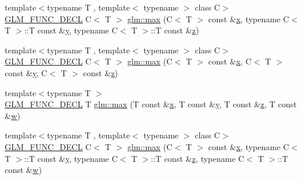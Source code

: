\begin{DoxyCompactItemize}
\item 
{\footnotesize template$<$typename T , template$<$ typename $>$ class C$>$ }\\\mbox{\hyperlink{setup_8hpp_ab2d052de21a70539923e9bcbf6e83a51}{G\+L\+M\+\_\+\+F\+U\+N\+C\+\_\+\+D\+E\+CL}} C$<$ T $>$ \mbox{\hyperlink{group__gtx__extended__min__max_gae1b7bbe5c91de4924835ea3e14530744}{glm\+::max}} (C$<$ T $>$ const \&\mbox{\hyperlink{_s_d_l__opengl_8h_ad0e63d0edcdbd3d79554076bf309fd47}{x}}, typename C$<$ T $>$\+::T const \&\mbox{\hyperlink{_s_d_l__opengl_8h_a1675d9d7bb68e1657ff028643b4037e3}{y}}, typename C$<$ T $>$\+::T const \&\mbox{\hyperlink{_s_d_l__opengl__glext_8h_a5e74030ebb3297ce1b37ff716fedd68f}{z}})
\item 
{\footnotesize template$<$typename T , template$<$ typename $>$ class C$>$ }\\\mbox{\hyperlink{setup_8hpp_ab2d052de21a70539923e9bcbf6e83a51}{G\+L\+M\+\_\+\+F\+U\+N\+C\+\_\+\+D\+E\+CL}} C$<$ T $>$ \mbox{\hyperlink{group__gtx__extended__min__max_gaf832e9d4ab4826b2dda2fda25935a3a4}{glm\+::max}} (C$<$ T $>$ const \&\mbox{\hyperlink{_s_d_l__opengl_8h_ad0e63d0edcdbd3d79554076bf309fd47}{x}}, C$<$ T $>$ const \&\mbox{\hyperlink{_s_d_l__opengl_8h_a1675d9d7bb68e1657ff028643b4037e3}{y}}, C$<$ T $>$ const \&\mbox{\hyperlink{_s_d_l__opengl__glext_8h_a5e74030ebb3297ce1b37ff716fedd68f}{z}})
\item 
{\footnotesize template$<$typename T $>$ }\\\mbox{\hyperlink{setup_8hpp_ab2d052de21a70539923e9bcbf6e83a51}{G\+L\+M\+\_\+\+F\+U\+N\+C\+\_\+\+D\+E\+CL}} T \mbox{\hyperlink{group__gtx__extended__min__max_ga78e04a0cef1c4863fcae1a2130500d87}{glm\+::max}} (T const \&\mbox{\hyperlink{_s_d_l__opengl_8h_ad0e63d0edcdbd3d79554076bf309fd47}{x}}, T const \&\mbox{\hyperlink{_s_d_l__opengl_8h_a1675d9d7bb68e1657ff028643b4037e3}{y}}, T const \&\mbox{\hyperlink{_s_d_l__opengl__glext_8h_a5e74030ebb3297ce1b37ff716fedd68f}{z}}, T const \&\mbox{\hyperlink{_s_d_l__opengl__glext_8h_a6ee8f168a7ab6785a9bb57c6715dad99}{w}})
\item 
{\footnotesize template$<$typename T , template$<$ typename $>$ class C$>$ }\\\mbox{\hyperlink{setup_8hpp_ab2d052de21a70539923e9bcbf6e83a51}{G\+L\+M\+\_\+\+F\+U\+N\+C\+\_\+\+D\+E\+CL}} C$<$ T $>$ \mbox{\hyperlink{group__gtx__extended__min__max_ga7cca8b53cfda402040494cdf40fbdf4a}{glm\+::max}} (C$<$ T $>$ const \&\mbox{\hyperlink{_s_d_l__opengl_8h_ad0e63d0edcdbd3d79554076bf309fd47}{x}}, typename C$<$ T $>$\+::T const \&\mbox{\hyperlink{_s_d_l__opengl_8h_a1675d9d7bb68e1657ff028643b4037e3}{y}}, typename C$<$ T $>$\+::T const \&\mbox{\hyperlink{_s_d_l__opengl__glext_8h_a5e74030ebb3297ce1b37ff716fedd68f}{z}}, typename C$<$ T $>$\+::T const \&\mbox{\hyperlink{_s_d_l__opengl__glext_8h_a6ee8f168a7ab6785a9bb57c6715dad99}{w}})

\end{DoxyCompactItemize}
